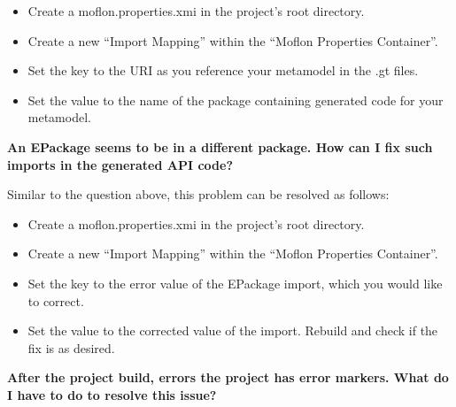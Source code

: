 \begin{itemize}

    \item Create a moflon.properties.xmi in the project’s root directory.
    
    \item Create a new “Import Mapping” within the “Moflon Properties Container”.
    
    \item Set the key to the URI as you reference your metamodel in the .gt files.
    
    \item Set the value to the name of the package containing generated code for your metamodel.\newline
    
\end{itemize}

\textbf{An EPackage seems to be in a different package. How can I fix such imports in the generated API code?}\newline

Similar to the question above, this problem can be resolved as follows:

\begin{itemize}

    \item Create a moflon.properties.xmi in the project’s root directory.
    
    \item Create a new “Import Mapping” within the “Moflon Properties Container”.
    
    \item Set the key to the error value of the EPackage import, which you would like to correct.
    
    \item Set the value to the corrected value of the import. Rebuild and check if the fix is as desired.\newline
    
\end{itemize}

\clearpage

\textbf{After the project build, errors the project has error markers. What do I have to do to resolve this issue?}

